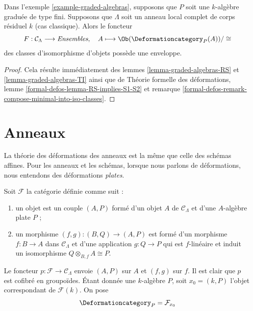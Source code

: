 \begin{lemma}
\label{lemma-graded-algebras-hull}
Dans l'exemple \ref{example-graded-algebras}, supposons que $P$ soit une
$k$-algèbre graduée de type fini. Supposons que $\Lambda$ soit un anneau local complet
de corps résiduel $k$
(cas classique). Alors le foncteur
$$
F : \mathcal{C}_\Lambda \longrightarrow \textit{Ensembles},\quad
A \longmapsto \Ob(\Deformationcategory_P(A))/\cong
$$
des classes d'isomorphisme d'objets possède une enveloppe.
\end{lemma}

\begin{proof}
Cela résulte immédiatement des lemmes \ref{lemma-graded-algebras-RS} et
\ref{lemma-graded-algebras-TI} ainsi que de
Théorie formelle des déformations, lemme \ref{formal-defos-lemma-RS-implies-S1-S2}
et remarque \ref{formal-defos-remark-compose-minimal-into-iso-classes}.
\end{proof}







\section{Anneaux}
\label{section-rings}

\noindent
La théorie des déformations des anneaux est la même que celle des
schémas affines. Pour les anneaux et les schémas, lorsque nous parlons de déformations,
nous entendons des déformations {\it plates}.

\begin{example}[Anneaux]
\label{example-rings}
Soit $\mathcal{F}$ la catégorie définie comme suit :
\begin{enumerate}
\item un objet est un couple $(A, P)$ formé d'un
objet $A$ de $\mathcal{C}_\Lambda$ et d'une $A$-algèbre plate $P$ ;
\item un morphisme $(f, g) : (B, Q) \to (A, P)$ est formé d'un
morphisme $f : B \to A$ dans $\mathcal{C}_\Lambda$ et
d'une application $g : Q \to P$ qui est $f$-linéaire et induit un
isomorphisme $Q \otimes_{B, f} A \cong P$.
\end{enumerate}
Le foncteur $p : \mathcal{F} \to \mathcal{C}_\Lambda$ envoie $(A, P)$
sur $A$ et $(f, g)$ sur $f$. Il est clair que $p$ est cofibré en groupoïdes.
Étant donnée une $k$-algèbre $P$, soit $x_0 = (k, P)$ l'objet correspondant
de $\mathcal{F}(k)$. On pose
$$
\Deformationcategory_P = \mathcal{F}_{x_0}
$$
\end{example}

